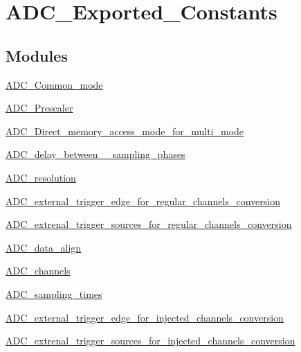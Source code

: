 \hypertarget{group___a_d_c___exported___constants}{}\section{A\+D\+C\+\_\+\+Exported\+\_\+\+Constants}
\label{group___a_d_c___exported___constants}
\subsection*{Modules}
\begin{DoxyCompactItemize}
\item 
\hyperlink{group___a_d_c___common__mode}{A\+D\+C\+\_\+\+Common\+\_\+mode}
\item 
\hyperlink{group___a_d_c___prescaler}{A\+D\+C\+\_\+\+Prescaler}
\item 
\hyperlink{group___a_d_c___direct__memory__access__mode__for__multi__mode}{A\+D\+C\+\_\+\+Direct\+\_\+memory\+\_\+access\+\_\+mode\+\_\+for\+\_\+multi\+\_\+mode}
\item 
\hyperlink{group___a_d_c__delay__between__2__sampling__phases}{A\+D\+C\+\_\+delay\+\_\+between\+\_\+\_\+sampling\+\_\+phases}
\item 
\hyperlink{group___a_d_c__resolution}{A\+D\+C\+\_\+resolution}
\item 
\hyperlink{group___a_d_c__external__trigger__edge__for__regular__channels__conversion}{A\+D\+C\+\_\+external\+\_\+trigger\+\_\+edge\+\_\+for\+\_\+regular\+\_\+channels\+\_\+conversion}
\item 
\hyperlink{group___a_d_c__extrenal__trigger__sources__for__regular__channels__conversion}{A\+D\+C\+\_\+extrenal\+\_\+trigger\+\_\+sources\+\_\+for\+\_\+regular\+\_\+channels\+\_\+conversion}
\item 
\hyperlink{group___a_d_c__data__align}{A\+D\+C\+\_\+data\+\_\+align}
\item 
\hyperlink{group___a_d_c__channels}{A\+D\+C\+\_\+channels}
\item 
\hyperlink{group___a_d_c__sampling__times}{A\+D\+C\+\_\+sampling\+\_\+times}
\item 
\hyperlink{group___a_d_c__external__trigger__edge__for__injected__channels__conversion}{A\+D\+C\+\_\+external\+\_\+trigger\+\_\+edge\+\_\+for\+\_\+injected\+\_\+channels\+\_\+conversion}
\item 
\hyperlink{group___a_d_c__extrenal__trigger__sources__for__injected__channels__conversion}{A\+D\+C\+\_\+extrenal\+\_\+trigger\+\_\+sources\+\_\+for\+\_\+injected\+\_\+channels\+\_\+conversion}

\end{DoxyCompactItemize}
